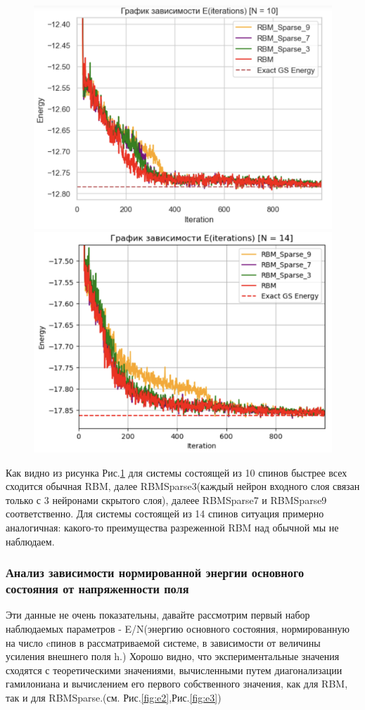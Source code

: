 \begin{figure}[H]
    \includegraphics[width=0.50\linewidth]{Course_work/Images/image7.png}
    \includegraphics[width=0.50\linewidth]{Course_work/Images/image8.png}
    \caption{}
    \label{fig:e1}
\end{figure}


Как видно из рисунка Рис.\ref{fig:e1} для системы состоящей из 10 спинов быстрее всех сходится обычная RBM, далее RBMSparse3(каждый нейрон входного слоя связан только с 3 нейронами скрытого слоя), далеее RBMSparse7 и RBMSparse9 соответственно. Для системы состоящей из 14 спинов ситуация примерно аналогичная: какого-то преимущества разреженной RBM над обычной мы не наблюдаем.
\vspace{0,25cm}

\subsubsection{Анализ зависимости нормированной энергии основного состояния от напряженности поля}
Эти данные не очень показательны, давайте рассмотрим первый набор наблюдаемых параметров - E/N(энергию основного состояния, нормированную на число cпинов в рассматриваемой системе, в зависимости от величины усиления внешнего поля h.)
Хорошо видно, что экспериментальные значения сходятся с теоретическими значениями, вычисленными путем диагонализации гамилониана и вычислением его первого собственного значения, как для RBM, так и для RBMSparse.(см. Рис.\ref{fig:e2},Рис.\ref{fig:e3})

